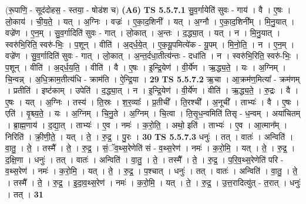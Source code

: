 \documentclass[17pt]{extarticle}
\begin{document}
                  \newline
                      (रू॒पाणि॒ - सूद॑दोहस॒ - स्तया॒ - षोड॑श च)  \textbf{(A6)} \newline \newline
                                \textbf{ TS 5.5.7.1} \newline
                  सु॒व॒र्गायेति॑ सुवः - गाय॑ । वै । ए॒षः । लो॒काय॑ । ची॒य॒ते॒ । यत् । अ॒ग्निः । वज्रः॑ । ए॒का॒द॒शिनी᳚ । यत् । अ॒ग्नौ । ए॒का॒द॒शिनी᳚म् । मि॒नु॒यात् । वज्रे॑ण । ए॒न॒म् । सु॒व॒र्गादिति॑ सुवः - गात् । लो॒कात् । अ॒न्तः । द॒द्ध्या॒त् । यत् । न । मि॒नु॒यात् । स्वरु॑भि॒रिति॒ स्वरु॑-भिः॒ । प॒शून् । वीति॑ । अ॒द्‌र्ध॒ये॒त् । ए॒क॒यू॒पमित्ये॑क - यू॒पम् । मि॒नो॒ति॒ । न । ए॒न॒म् । वज्रे॑ण । सु॒व॒र्गादिति॑ सुवः - गात् । लो॒कात् । अ॒न्त॒र्दधा॒तीत्य॑न्तः - दधा॑ति । न । स्वरु॑भि॒रिति॒ स्वरु॑-भिः॒ । प॒शून् । वीति॑ । अ॒द्‌र्ध॒य॒ति॒ । वीति॑ । वै । ए॒षः । इ॒न्द्रि॒येण॑ । वी॒र्ये॑ण । ऋ॒द्ध्य॒ते॒ । यः । अ॒ग्निम् । चि॒न्वन्न् । अ॒धि॒क्राम॒तीत्य॑धि - क्राम॑ति । ऐ॒न्द्रि॒या । \textbf{  29} \newline
                  \newline
                                \textbf{ TS 5.5.7.2} \newline
                  ऋ॒चा । आ॒क्रम॑ण॒मित्या᳚ - क्रम॑णम् । प्रतीति॑ । इष्ट॑काम् । उपेति॑ । द॒द्ध्या॒त् । न । इ॒न्द्रि॒येण॑ । वी॒र्ये॑ण । वीति॑ । ऋ॒द्ध्य॒ते॒ । रु॒द्रः । वै । ए॒षः । यत् । अ॒ग्निः । तस्य॑ । ति॒स्रः । श॒र॒व्याः᳚ । प्र॒तीची᳚ । ति॒रश्ची᳚ । अ॒नूची᳚ । ताभ्यः॑ । वै । ए॒षः । एति॑ । वृ॒श्च्य॒ते॒ । यः । अ॒ग्निम् । चि॒नु॒ते । अ॒ग्निम् । चि॒त्वा । ति॒सृ॒ध॒न्वमिति॑ तिसृ - ध॒न्वम् । अया॑चितम् । ब्रा॒ह्म॒णाय॑ । द॒द्या॒त् । ताभ्यः॑ । ए॒व । नमः॑ । क॒रो॒ति॒ । अथो॒ इति॑ । ताभ्यः॑ । ए॒व । आ॒त्मान᳚म् । निरिति॑ । क्री॒णी॒ते॒ । यत् । ते॒ । रु॒द्र॒ । पु॒रः । \textbf{  30} \newline
                  \newline
                                \textbf{ TS 5.5.7.3} \newline
                  धनुः॑ । तत् । वातः॑ । अन्विति॑ । वा॒तु॒ । ते॒ । तस्मै᳚ । ते॒ । रु॒द्र॒ । सं॒ॅव॒थ्स॒रेणेति॑ सं - व॒थ्स॒रेण॑ । नमः॑ । क॒रो॒मि॒ । यत् । ते॒ । रु॒द्र॒ । द॒क्षि॒णा । धनुः॑ । तत् । वातः॑ । अन्विति॑ । वा॒तु॒ । ते॒ । तस्मै᳚ । ते॒ । रु॒द्र॒ । प॒रि॒व॒थ्स॒रेणेति॑ परि - व॒थ्स॒रेण॑ । नमः॑ । क॒रो॒मि॒ । यत् । ते॒ । रु॒द्र॒ । प॒श्चात् । धनुः॑ । तत् । वातः॑ । अन्विति॑ । वा॒तु॒ । ते॒ । तस्मै᳚ । ते॒ । रु॒द्र॒ । इ॒दा॒व॒थ्स॒रेण॑ । नमः॑ । क॒रो॒मि॒ । यत् । ते॒ । रु॒द्र॒ । उ॒त्त॒रादित्यु॑त् - त॒रात् । धनुः॑ । तत् । \textbf{  31} \newline
\end{document}
